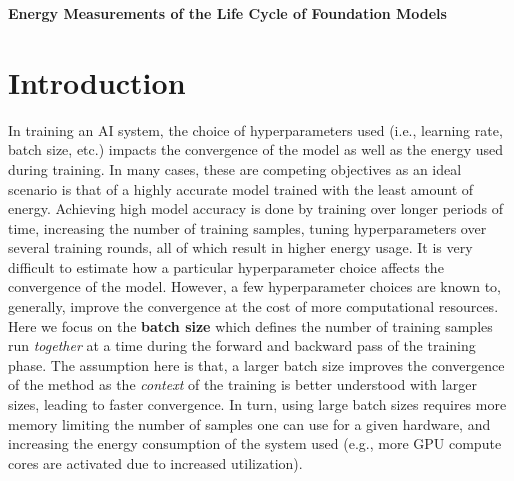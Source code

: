 \documentclass{article}
\begin{document}
    \center \Large{\textbf{Energy Measurements of the Life Cycle of Foundation Models}}


    \section{Introduction}
    {
        In training an AI system, the choice of hyperparameters used (i.e., learning rate, batch size, etc.) impacts the convergence of the model as well as the energy used during training. In many cases, these are competing objectives as an ideal scenario is that of a highly accurate model trained with the least amount of energy. Achieving high model accuracy is done by training over longer periods of time, increasing the number of training samples, tuning hyperparameters over several training rounds, all of which result in higher energy usage. It is very difficult to estimate how a particular hyperparameter choice affects the convergence of the model. However, a few hyperparameter choices are known to, generally, improve the convergence at the cost of more computational resources. Here we focus on the \textbf{batch size} which defines the number of training samples run \textit{together} at a time during the forward and backward pass of the training phase. The assumption here is that, a larger batch size improves the convergence of the method as the \textit{context} of the training is better understood with larger sizes, leading to faster convergence. In turn, using large batch sizes requires more memory limiting the number of samples one can use for a given hardware, and increasing the energy consumption of the system used (e.g., more GPU compute cores are activated due to increased utilization). 
    }
\end{document}
